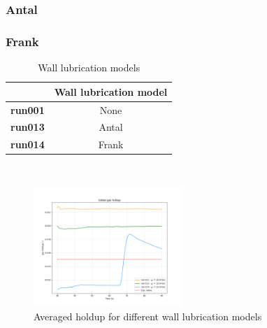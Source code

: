 \documentclass[11pt,a4paper]{article}
\begin{document}
\subsubsection{Antal}

\subsubsection{Frank}

\begin{table}[H]
    \centering 
    \begin{tabular}{|p{8em} c |}
    \hline
    \rowcolor{bluePoli!40}
    & \textbf{Wall lubrication model} \T\B \\
    \hline \hline
    \textbf{run001} & None \T\B \\
    \textbf{run013} & Antal \T\B \\
    \textbf{run014} & Frank \T\B \\
    \hline
    \end{tabular}
    \\[10pt]
    \caption{Wall lubrication models}
    \label{table:wall_lubrication_models}
\end{table}

\begin{figure}[H]
    \centering
    \includegraphics[width=0.5\textwidth]{Images/graphs/walllub/holdUp10.png}
    \caption{Averaged holdup for different wall lubrication models}
    \label{fig:holdup_walllub}
\end{figure}
\end{document}
